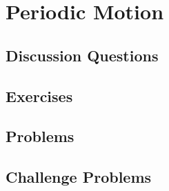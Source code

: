 
\chapter{Periodic Motion}

\section{Discussion Questions}

\section{Exercises}

\section{Problems}

\section{Challenge Problems}
